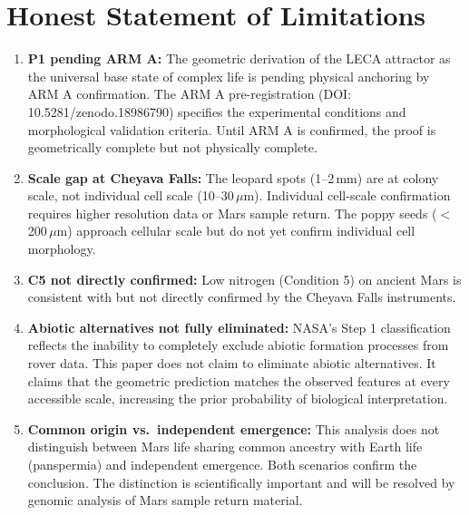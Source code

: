 \documentclass[11pt, a4paper]{article}
\begin{document}
\section{Honest Statement of Limitations}

\begin{enumerate}[leftmargin=*, label=(\arabic*)]
\item \textbf{P1 pending ARM A:} The geometric derivation
  of the LECA attractor as the universal base state of
  complex life is pending physical anchoring by ARM A
  confirmation. The ARM A pre-registration
  (DOI: 10.5281/zenodo.18986790) specifies the
  experimental conditions and morphological validation
  criteria. Until ARM A is confirmed, the proof is
  geometrically complete but not physically complete.

\item \textbf{Scale gap at Cheyava Falls:} The leopard
  spots (1--2\,mm) are at colony scale, not individual
  cell scale (10--30\,$\mu$m). Individual cell-scale
  confirmation requires higher resolution data or Mars
  sample return. The poppy seeds ($<$200\,$\mu$m)
  approach cellular scale but do not yet confirm
  individual cell morphology.

\item \textbf{C5 not directly confirmed:} Low nitrogen
  (Condition 5) on ancient Mars is consistent with
  but not directly confirmed by the Cheyava Falls
  instruments.

\item \textbf{Abiotic alternatives not fully eliminated:}
  NASA's Step 1 classification reflects the inability
  to completely exclude abiotic formation processes from
  rover data. This paper does not claim to eliminate
  abiotic alternatives. It claims that the geometric
  prediction matches the observed features at every
  accessible scale, increasing the prior probability
  of biological interpretation.

\item \textbf{Common origin vs.\ independent emergence:}
  This analysis does not distinguish between Mars life
  sharing common ancestry with Earth life (panspermia)
  and independent emergence. Both scenarios confirm the
  conclusion. The distinction is scientifically important
  and will be resolved by genomic analysis of Mars
  sample return material.
\end{enumerate}

\end{document}
